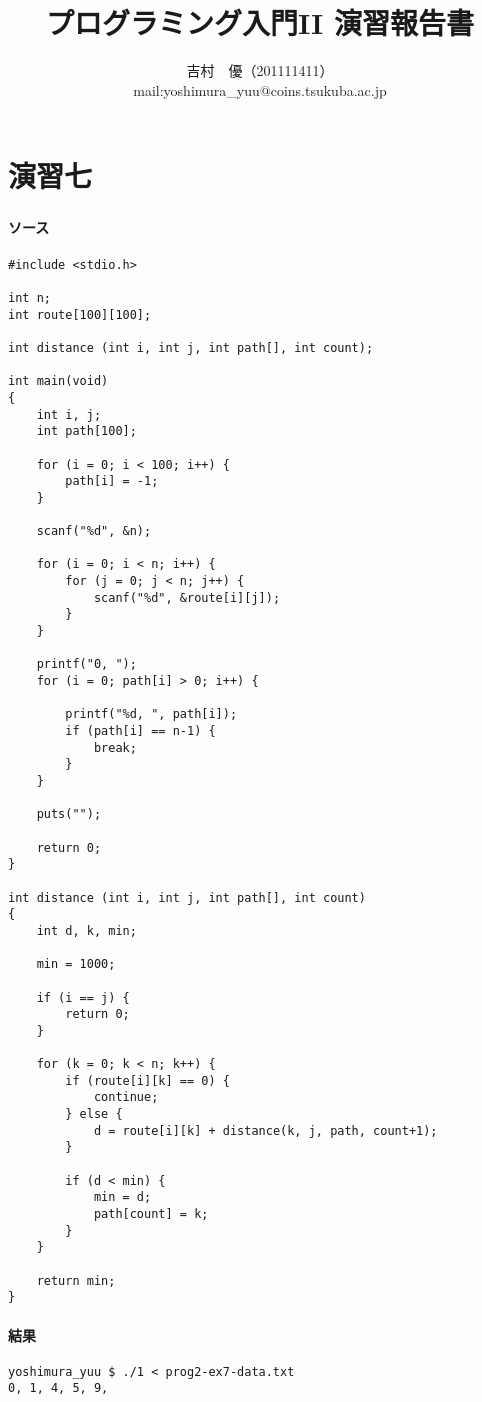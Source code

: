 \documentclass[11pt,a4paper,a4j]{jsarticle}
\title{プログラミング入門II 演習報告書}
\author{吉村　優（201111411）\\
mail:yoshimura\_yuu@coins.tsukuba.ac.jp}
\begin{document}
\maketitle

\part*{演習七}

\section{}
\subsection{ソース}

\begin{lstlisting}
#include <stdio.h>

int n;
int route[100][100];

int distance (int i, int j, int path[], int count);

int main(void)
{
	int i, j;
	int path[100];

	for (i = 0; i < 100; i++) {
		path[i] = -1;
	}

	scanf("%d", &n);

	for (i = 0; i < n; i++) {
		for (j = 0; j < n; j++) {
			scanf("%d", &route[i][j]);
		}
	}

	printf("0, ");
	for (i = 0; path[i] > 0; i++) {
		
		printf("%d, ", path[i]);
		if (path[i] == n-1) {
			break;
		}
	}

	puts("");

	return 0;
}

int distance (int i, int j, int path[], int count)
{
	int d, k, min;

	min = 1000;

	if (i == j) {
		return 0;
	}

	for (k = 0; k < n; k++) {
		if (route[i][k] == 0) {
			continue;
		} else {
			d = route[i][k] + distance(k, j, path, count+1);
		}

		if (d < min) {
			min = d;
			path[count] = k;
		}
	}

	return min;
}
\end{lstlisting}

\subsection{結果}
\begin{shadebox}
\begin{verbatim}
yoshimura_yuu $ ./1 < prog2-ex7-data.txt
0, 1, 4, 5, 9,
\end{verbatim}
\end{shadebox}
\end{document}
